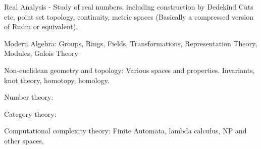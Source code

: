 \documentclass{book}
\begin{document}
    Real Analysis - Study of real numbers, including construction by Dedekind Cuts etc, point set topology, continuity, metric spaces (Basically a compressed version of Rudin or equivalent).


    Modern Algebra:  Groups, Rings, Fields, Transformations, Representation Theory, Modules, Galois Theory


    Non-euclidean geometry and topology:  Various spaces and properties.  Invariants, knot theory, homotopy, homology.


    Number theory:


    Category theory:


    Computational complexity theory:  Finite Automata, lambda calculus, NP and other spaces.
    
\tableofcontents





\printindex
\end{document}
